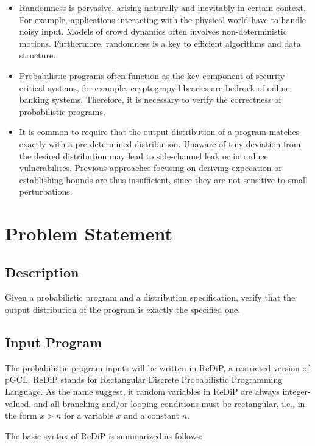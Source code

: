 \documentclass[a4paper]{article}
\begin{document}
\begin{itemize}
	\item Randomness is pervasive, arising naturally and inevitably in certain context.
	      For example, applications interacting with the physical world have to handle noisy input.
	      Models of crowd dynamics often involves non-deterministic motions.
	      Furthermore, randomness is a key to efficient algorithms and data structure.
	\item Probabilistic programs often function as the key component of security-critical systems,
	      for example, cryptograpy libraries are bedrock of online banking systems.
	      Therefore, it is necessary to verify the correctness of probabilistic programs.
	\item It is common to require that the output distribution of a program matches exactly with a pre-determined distribution.
	      Unaware of tiny deviation from the desired distribution may lead to side-channel leak or introduce vulnerabilites.
	      Previous approaches focusing on deriving expecation or establishing bounds are thus insufficient,
	      since they are not sensitive to small perturbations.
\end{itemize}

\section{Problem Statement}

\subsection{Description}
Given a probabilistic program and a distribution specification, verify that the output distribution of the program is exactly the specified one.

\subsection{Input Program}
The probabilistic program inputs will be written in ReDiP, a restricted version of pGCL.
ReDiP stands for Rectangular Discrete Probabilistic Programming Language.
As the name suggest, it random variables in ReDiP are always integer-valued,
and all branching and/or looping conditions must be rectangular, i.e., in the form \(x > n\) for a variable \(x\) and a constant \(n\).

The basic syntax of ReDiP is summarized as follows:
\end{document}
